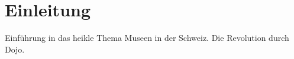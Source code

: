 \section{Einleitung} \label{sec:einleitung}
Einführung in das heikle Thema Museen in der Schweiz. Die Revolution durch Dojo.